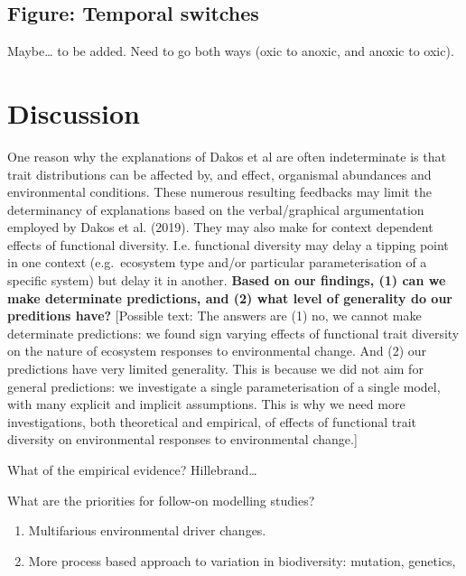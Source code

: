 \documentclass{article}
\begin{document}
\hypertarget{figure-temporal-switches}{%
\subsection{Figure: Temporal switches}\label{figure-temporal-switches}}

Maybe\ldots{} to be added. Need to go both ways (oxic to anoxic, and
anoxic to oxic).

\hypertarget{discussion}{%
\section{Discussion}\label{discussion}}

One reason why the explanations of Dakos et al are often indeterminate
is that trait distributions can be affected by, and effect, organismal
abundances and environmental conditions. These numerous resulting
feedbacks may limit the determinancy of explanations based on the
verbal/graphical argumentation employed by Dakos et al. (2019). They may
also make for context dependent effects of functional diversity. I.e.
functional diversity may delay a tipping point in one context
(e.g.~ecosystem type and/or particular parameterisation of a specific
system) but delay it in another. \textbf{Based on our findings, (1) can
we make determinate predictions, and (2) what level of generality do our
preditions have?} {[}Possible text: The answers are (1) no, we cannot
make determinate predictions: we found sign varying effects of
functional trait diversity on the nature of ecosystem responses to
environmental change. And (2) our predictions have very limited
generality. This is because we did not aim for general predictions: we
investigate a single parameterisation of a single model, with many
explicit and implicit assumptions. This is why we need more
investigations, both theoretical and empirical, of effects of functional
trait diversity on environmental responses to environmental change.{]}

What of the empirical evidence? Hillebrand\ldots{}

What are the priorities for follow-on modelling studies?

\begin{enumerate}
\def\labelenumi{\arabic{enumi})}
\tightlist
\item
  Multifarious environmental driver changes.
\item
  More process based approach to variation in biodiversity: mutation,
  genetics,
\end{enumerate}
\end{document}
